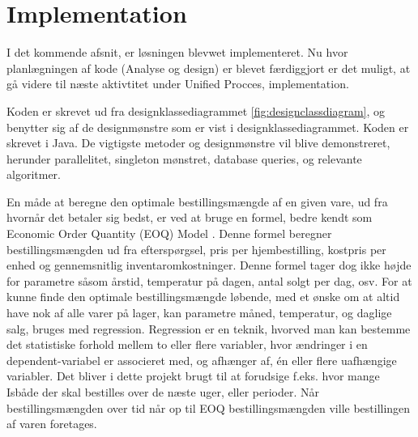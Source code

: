 \chapter{Implementation}\label{ch:implementation}
I det kommende afsnit, er løsningen blevwet implementeret. Nu hvor planlægningen af kode (Analyse og design) er blevet færdiggjort er det muligt, at gå videre til næste aktivtitet under Unified Procces, implementation\cite{UnifiedProcess}. 

Koden er skrevet ud fra designklassediagrammet \ref{fig:designclassdiagram}, og benytter sig af de designmønstre som er vist i designklassediagrammet. Koden er skrevet i Java. 
De vigtigste metoder og designmønstre vil blive demonstreret, herunder parallelitet, singleton mønstret, database queries, og relevante algoritmer.



En måde at beregne den optimale bestillingsmængde af en given vare, ud fra hvornår det betaler sig bedst, er ved at bruge en formel, bedre kendt som Economic Order Quantity (EOQ) Model \cite{EOQ}. Denne formel beregner bestillingsmængden ud fra efterspørgsel, pris per hjembestilling, kostpris per enhed og gennemsnitlig inventaromkostninger. Denne formel tager dog ikke højde for parametre såsom årstid, temperatur på dagen, antal solgt per dag, osv. For at kunne finde den optimale bestillingsmængde løbende, med et ønske om at altid have nok af alle varer på lager, kan parametre måned, temperatur, og daglige salg, bruges med regression. Regression er en teknik, hvorved man kan bestemme det statistiske forhold mellem to eller flere variabler, hvor ændringer i en dependent-variabel er associeret med, og afhænger af, én eller flere uafhængige variabler. Det bliver i dette projekt brugt til at forudsige f.eks. hvor mange Isbåde\cite{Isbåd} der skal bestilles over de næste uger, eller perioder. Når bestillingsmængden over tid når op til EOQ bestillingsmængden ville bestillingen af varen foretages.


